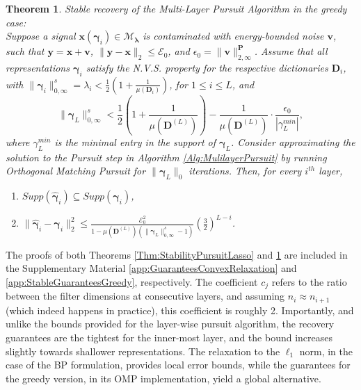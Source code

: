 \documentclass[10pt,journal]{IEEEtran}
\def\x{{\mathbf x}}
\def\v{{\mathbf v}}
\def\y{{\mathbf y}}
\def\D{{\mathbf D}}
\def\M{{\mathcal{M}}}
\def\PP{{\mathbf P}}
\def\gama{{\boldsymbol \gamma}}
\def\lamda{{\boldsymbol \lambda}}
\def\pp{{\scriptscriptstyle{\PP}}}
\theoremstyle{plain}
\newtheorem{thm}{Theorem} %
\theoremstyle{definition}
\begin{document}
\begin{thm}{Stable recovery of the Multi-Layer Pursuit Algorithm in the greedy case:} \label{Thm:StabilityPursuitOMP} \\
	Suppose a signal $\x(\gama_i) \in \M_\lamda$ is contaminated with energy-bounded noise $\v$, such that $\y = \x + \v$, $\|\y-\x\|_2 \leq \mathcal{E}_0$, and $\epsilon_0 = \|\v\|^\pp_{2,\infty}$. Assume that all representations $\gama_i$ satisfy the N.V.S. property for the respective dictionaries $\D_i$, with $\|\gama_i\|^s_{0,\infty} = \lambda_i < \frac{1}{2}\left(1+\frac{1}{\mu(\D_i)}\right)$, for $1\leq i \leq L$, and
	\begin{equation} \label{omp_hypothesis}
	\|\gama_L\|^s_{0,\infty} < \frac{1}{2}\left( 1+\frac{1}{\mu(\D^{(L)})} \right)-\frac{1}{\mu(\D^{(L)})}\cdot\frac{\epsilon_0}{|\gamma_{L}^{min}|},
	\end{equation}
	where $\gamma_{L}^{min}$ is the minimal entry in the support of $\gama_{L}$.
	Consider approximating the solution to the Pursuit step in Algorithm \ref{Alg:MulilayerPursuit} by running Orthogonal Matching Pursuit for $\|\gama_L\|_0$ iterations. Then, for every $i^{th}$ layer,
	\begin{enumerate}
		\item $Supp(\hat{\gama}_i) \subseteq Supp(\gama_i)$,
		\item $\|\hat{\gama}_i - \gama_i\|^2_2 \leq \frac{\mathcal{E}_0^2}{1-\mu(\D^{(L)})(\|\gama_L\|^s_{0,\infty}-1)} \left(\frac{3}{2}\right)^{L-i}$.
	\end{enumerate}
\end{thm}

The proofs of both Theorems \ref{Thm:StabilityPursuitLasso} and \ref{Thm:StabilityPursuitOMP} are included in the Supplementary Material \ref{app:GuaranteesConvexRelaxation} and \ref{app:StableGuaranteesGreedy}, respectively. The coefficient $c_j$ refers to the ratio between the filter dimensions at consecutive layers, and assuming $n_i \approx n_{i+1}$ (which indeed happens in practice), this coefficient is roughly 2. 
Importantly, and unlike the bounds provided for the layer-wise pursuit algorithm, the recovery guarantees are the tightest for the inner-most layer, and the bound increases slightly towards shallower representations. The relaxation to the $\ell_1$ norm, in the case of the BP formulation, provides local error bounds, while the guarantees for the greedy version, in its OMP implementation, yield a global alternative. 
\end{document}
